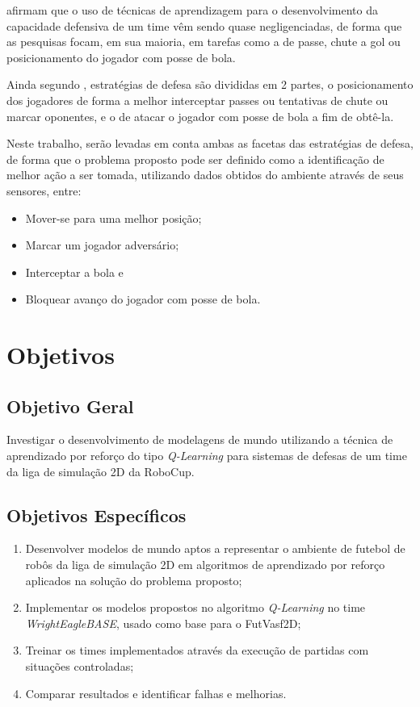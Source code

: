  afirmam que o uso de técnicas de aprendizagem para o desenvolvimento da
capacidade defensiva de um time vêm sendo quase negligenciadas, de forma que as pesquisas focam, em
sua maioria, em tarefas como a de passe, chute a gol ou posicionamento do jogador com posse de bola.

Ainda segundo , estratégias de defesa são divididas em 2 partes, o
posicionamento dos jogadores de forma a melhor interceptar passes ou tentativas de chute ou marcar
oponentes, e o de atacar o jogador com posse de bola a fim de obtê-la.

Neste trabalho, serão levadas em conta ambas as facetas das estratégias de defesa, de forma que o
problema proposto pode ser definido como a identificação de melhor ação a ser tomada, utilizando
dados obtidos do ambiente através de seus sensores, entre:

\begin{itemize}
    \item Mover-se para uma melhor posição;
    \item Marcar um jogador adversário; 
    \item Interceptar a bola e
    \item Bloquear avanço do jogador com posse de bola.
\end{itemize}

\section{Objetivos}

\subsection{Objetivo Geral}

Investigar o desenvolvimento de modelagens de mundo utilizando a técnica de
aprendizado por reforço do tipo \textit{Q-Learning} para sistemas de defesas de
um time da liga de simulação 2D da RoboCup.

\subsection{Objetivos Específicos}

\begin{enumerate}
    \item Desenvolver modelos de mundo aptos a representar o ambiente de futebol de robôs da liga de
    simulação 2D em algoritmos de aprendizado por reforço aplicados na solução do problema proposto;
    
    \item Implementar os modelos propostos no algoritmo \textit{Q-Learning} no time
    \textit{WrightEagleBASE}, usado como base para o FutVasf2D;
    
    \item Treinar os times implementados através da execução de partidas com situações controladas;
    
    \item Comparar resultados e identificar falhas e melhorias.
\end{enumerate}

